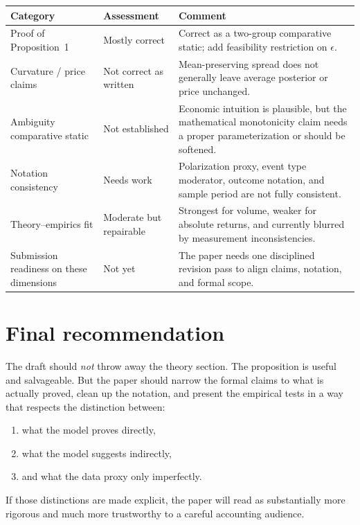 \documentclass[11pt]{article}
\begin{document}
\begin{center}
\begin{tabular}{p{}p{}p{}}
\toprule
\textbf{Category} & \textbf{Assessment} & \textbf{Comment} \\
\midrule
Proof of Proposition~1 & Mostly correct & Correct as a two-group comparative static; add feasibility restriction on $\epsilon$. \\
Curvature / price claims & Not correct as written & Mean-preserving spread does not generally leave average posterior or price unchanged. \\
Ambiguity comparative static & Not established & Economic intuition is plausible, but the mathematical monotonicity claim needs a proper parameterization or should be softened. \\
Notation consistency & Needs work & Polarization proxy, event type moderator, outcome notation, and sample period are not fully consistent. \\
Theory--empirics fit & Moderate but repairable & Strongest for volume, weaker for absolute returns, and currently blurred by measurement inconsistencies. \\
Submission readiness on these dimensions & Not yet & The paper needs one disciplined revision pass to align claims, notation, and formal scope. \\
\bottomrule
\end{tabular}
\end{center}

\section*{Final recommendation}

The draft should \emph{not} throw away the theory section. The proposition is useful and salvageable. But the paper should narrow the formal claims to what is actually proved, clean up the notation, and present the empirical tests in a way that respects the distinction between:

\begin{enumerate}[leftmargin=1.5em]
    \item what the model proves directly,
    \item what the model suggests indirectly,
    \item and what the data proxy only imperfectly.
\end{enumerate}

If those distinctions are made explicit, the paper will read as substantially more rigorous and much more trustworthy to a careful accounting audience.
\end{document}
